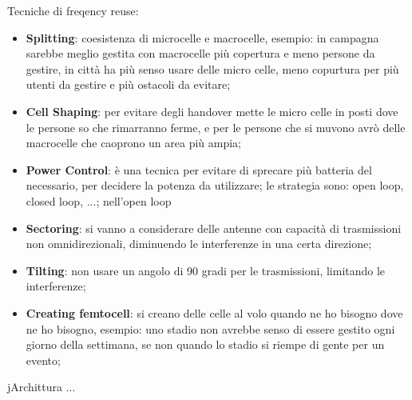 \documentclass[12pt]{article}
\begin{document}
Tecniche di freqency reuse:
\begin{itemize}
    \item \textbf{Splitting}: coesistenza di microcelle e macrocelle, esempio: in campagna sarebbe meglio gestita con macrocelle pi\`u copertura e meno persone da gestire, in citt\`a ha pi\`u senso usare delle micro celle, meno copurtura per pi\`u utenti da gestire e pi\`u ostacoli da evitare;
    \item \textbf{Cell Shaping}: per evitare degli handover mette le micro celle in posti dove le persone so che rimarranno ferme, e per le persone che si muvono avr\`o delle macrocelle che caoprono un area pi\`u ampia;
    \item \textbf{Power Control}: \`e una tecnica per evitare di sprecare pi\`u batteria del necessario, per decidere la potenza da utilizzare; le strategia sono: open loop, closed loop, ...; nell'open loop 
    \item \textbf{Sectoring}: si vanno a considerare delle antenne con capacit\`a di trasmissioni non omnidirezionali, diminuendo le interferenze in una certa direzione;
    \item \textbf{Tilting}: non usare un angolo di 90 gradi per le trasmissioni, limitando le interferenze;
    \item \textbf{Creating femtocell}: si creano delle celle al volo quando ne ho bisogno dove ne ho bisogno, esempio: uno stadio non avrebbe senso di essere gestito ogni giorno della settimana, se non quando lo stadio si riempe di gente per un evento;
\end{itemize}

jArchittura ...
\end{document}

